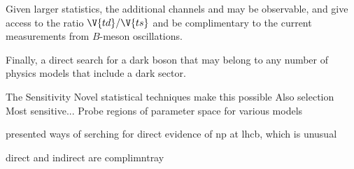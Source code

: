 Given larger statistics, the additional channels \decay{\Bp}{\Kp\Km\pip} and \decay{\Bp}{\pip\pipi}
may be observable, and give access to the ratio $\V{td}/\V{ts}$ and be complimentary to the current
measurements from $B$-meson oscillations.






Finally, a direct search for a dark boson that may belong to any number of \bsm physics models that
include a dark sector.

The
\btokstrdb
Sensitivity
Novel statistical techniques make this possible
Also selection
Most sensitive...
Probe regions of parameter space for various models



%
%
%
%
%

presented ways of serching for direct evidence of np at lhcb, which is unusual


direct and indirect are complimntray






